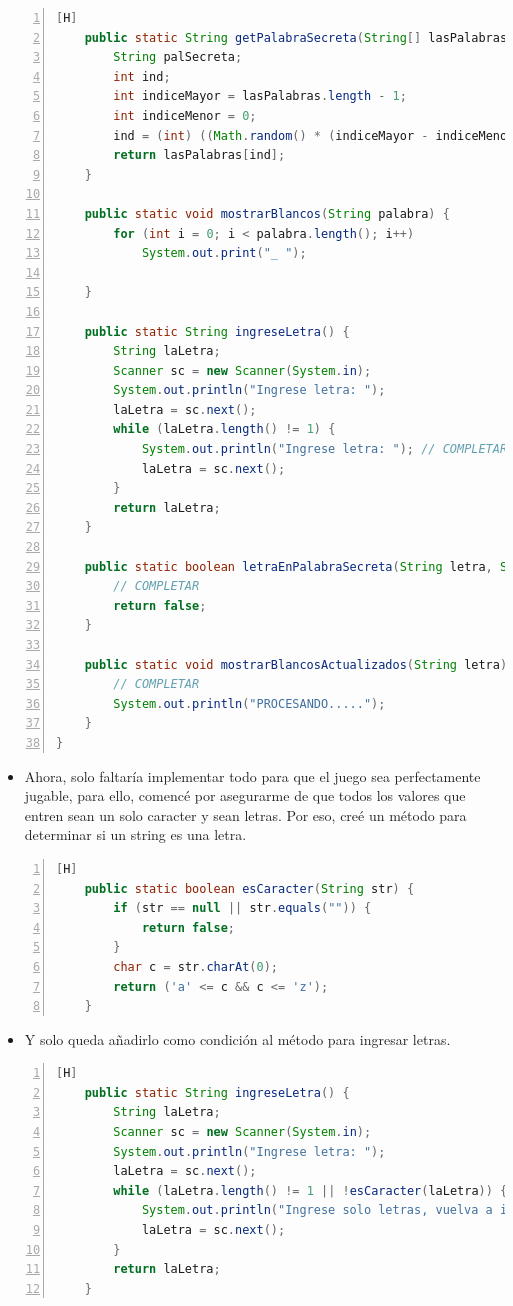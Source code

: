 \documentclass{article}
\begin{document}
\begin{lstlisting}[language=java,caption={Código parcial}, numbers=left][H]
    public static String getPalabraSecreta(String[] lasPalabras) {
        String palSecreta;
        int ind;
        int indiceMayor = lasPalabras.length - 1;
        int indiceMenor = 0;
        ind = (int) ((Math.random() * (indiceMayor - indiceMenor + 1) + indiceMenor));
        return lasPalabras[ind];
    }

    public static void mostrarBlancos(String palabra) {
        for (int i = 0; i < palabra.length(); i++)
            System.out.print("_ ");

    }

    public static String ingreseLetra() {
        String laLetra;
        Scanner sc = new Scanner(System.in);
        System.out.println("Ingrese letra: ");
        laLetra = sc.next();
        while (laLetra.length() != 1) {
            System.out.println("Ingrese letra: "); // COMPLETAR PARA VALIDAR CARACTERES PERMITIDOS
            laLetra = sc.next();
        }
        return laLetra;
    }

    public static boolean letraEnPalabraSecreta(String letra, String palSecreta) {
        // COMPLETAR
        return false;
    }

    public static void mostrarBlancosActualizados(String letra) {
        // COMPLETAR
        System.out.println("PROCESANDO.....");
    }
}
	\end{lstlisting}
	\begin{itemize}	
		\item Ahora, solo faltaría implementar todo para que el juego sea perfectamente jugable, para ello, comencé por asegurarme de que todos los valores que entren sean un solo caracter y sean letras. Por eso, creé un método para determinar si un string es una letra.  
	\end{itemize}
	\begin{lstlisting}[language=java,caption={Asegurándome de que solo entren letras}, numbers=left][H]
	public static boolean esCaracter(String str) {
        if (str == null || str.equals("")) {
            return false;
        }
        char c = str.charAt(0);
        return ('a' <= c && c <= 'z');
    }
	\end{lstlisting}
	\begin{itemize}	
		\item Y solo queda añadirlo como condición al método para ingresar letras.  
	\end{itemize}
	\begin{lstlisting}[language=java,caption={Método ya armado y preparado}, numbers=left][H]
	public static String ingreseLetra() {
        String laLetra;
        Scanner sc = new Scanner(System.in);
        System.out.println("Ingrese letra: ");
        laLetra = sc.next();
        while (laLetra.length() != 1 || !esCaracter(laLetra)) {
            System.out.println("Ingrese solo letras, vuelva a intentarlo");
            laLetra = sc.next();
        }
        return laLetra;
    }
	\end{lstlisting}
\end{document}
